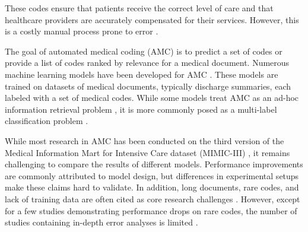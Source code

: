 {These codes ensure that patients receive the correct level of care and that healthcare providers are accurately compensated for their services. However, this is a costly manual process prone to error \parencite{tsengAdministrativeCostsAssociated2018, omalleyMeasuringDiagnosesICD2005, burnsSystematicReviewDischarge2012}.

The goal of automated medical coding (AMC) is to predict a set of codes or provide a list of codes ranked by relevance for a medical document. Numerous machine learning models have been developed for AMC \parencite{jiUnifiedReviewDeep2022, tengReviewDeepNeural2022, stanfillSystematicLiteratureReview2010}. These models are trained on datasets of medical documents, typically discharge summaries, each labeled with a set of medical codes.
While some models treat AMC as an ad-hoc information retrieval problem \parencite{rizzoICDCodeRetrieval2015,parkInformationRetrievalApproach2019}, it is more commonly posed as a multi-label classification problem \parencite{tengReviewDeepNeural2022, jiUnifiedReviewDeep2022}.

While most research in AMC has been conducted on the third version of the Medical Information Mart for Intensive Care dataset (MIMIC-III) \parencite{tengReviewDeepNeural2022, venkateshAutomatingOverburdenedClinical2023}, it remains challenging to compare the results of different models. Performance improvements are commonly attributed to model design, but differences in experimental setups make these claims hard to validate.
In addition, long documents, rare codes, and lack of training data are often cited as core research challenges \parencite{baoMedicalCodePrediction2021,dongAutomatedClinicalCoding2022,dongExplainableAutomatedCoding2021,feuchtDescriptionbasedLabelAttention2021,gaoLimitationsTransformersClinical2021,huangPLMICDAutomaticICD2022,jiDoesMagicBERT2021,jiUnifiedReviewDeep2022,kavuluruEmpiricalEvaluationSupervised2015,kimReadAttendCode2021,liICDCodingClinical2020,liuEffectiveConvolutionalAttention2021,michalopoulosICDBigBirdContextualEmbedding2022,moonsComparisonDeepLearning2020,pascualBERTbasedAutomaticICD2021,tengReviewDeepNeural2022,tengExplainablePredictionMedical2020,xieEHRCodingMultiscale2019,yangKnowledgeInjectedPrompt2022,zhangBERTXMLLargeScale2020,zhouAutomaticICDCoding2021, vuLabelAttentionModel2020, venkateshAutomatingOverburdenedClinical2023}. However, except for a few studies demonstrating performance drops on rare codes, the number of studies containing in-depth error analyses is limited \parencite{baoMedicalCodePrediction2021,dongExplainableAutomatedCoding2021,jiDoesMagicBERT2021}.

}
